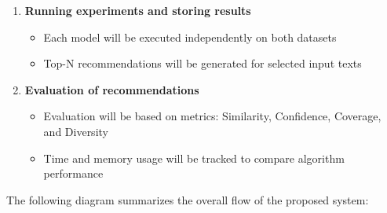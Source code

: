 \documentclass[\myFontSize,oneside,english,hidelinks,a4paper]{article}
\begin{document}
\begin{enumerate}
    \item \textbf{Running experiments and storing results}
    \begin{itemize}
        \item Each model will be executed independently on both datasets
        \item Top-N recommendations will be generated for selected input texts
    \end{itemize}

    \item \textbf{Evaluation of recommendations}
    \begin{itemize}
        \item Evaluation will be based on metrics: Similarity, Confidence, Coverage, and Diversity
        \item Time and memory usage will be tracked to compare algorithm performance
    \end{itemize}


\end{enumerate}
%
The following diagram summarizes the overall flow of the proposed system:
\end{document}
